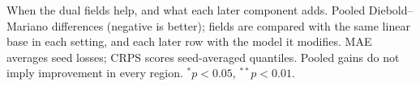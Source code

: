 \providecommand{\materialsdir}{.}
\begin{table}[t]
  \centering
  \caption{When the dual fields help, and what each later component adds.
    Pooled Diebold--Mariano differences (negative is better); fields are
    compared with the same linear base in each setting, and each later row
    with the model it modifies. MAE averages seed losses; CRPS scores
    seed-averaged quantiles. Pooled gains do not imply improvement in every
    region. $^{*}p<0.05$, $^{**}p<0.01$.}
  \label{tab:ablations}
  \small
  
\end{table}
